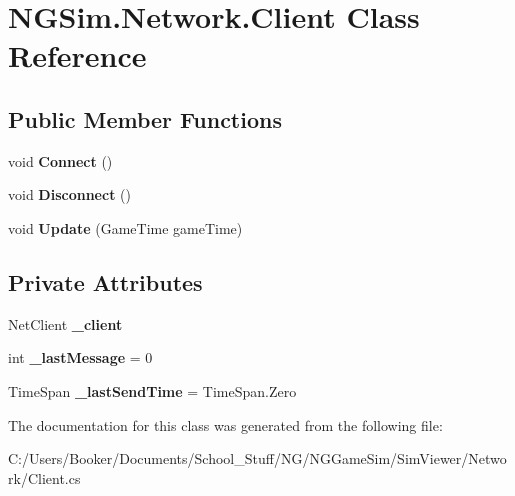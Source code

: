 \hypertarget{class_n_g_sim_1_1_network_1_1_client}{}\section{N\+G\+Sim.\+Network.\+Client Class Reference}
\label{class_n_g_sim_1_1_network_1_1_client}
\subsection*{Public Member Functions}
\begin{DoxyCompactItemize}
\item 
\mbox{\label{class_n_g_sim_1_1_network_1_1_client_a433d09b084cb3bccb2d19d34405b5c9a}} 
void {\bfseries Connect} ()
\item 
\mbox{\label{class_n_g_sim_1_1_network_1_1_client_aa3309ae7bdb5ad6c48073cc23f9ca41e}} 
void {\bfseries Disconnect} ()
\item 
\mbox{\label{class_n_g_sim_1_1_network_1_1_client_a5bd1f0db962cec9217a19025d5abdaea}} 
void {\bfseries Update} (Game\+Time game\+Time)
\end{DoxyCompactItemize}
\subsection*{Private Attributes}
\begin{DoxyCompactItemize}
\item 
\mbox{\label{class_n_g_sim_1_1_network_1_1_client_a4b246ac083f09bc74fd991f14786df17}} 
Net\+Client {\bfseries \+\_\+client}
\item 
\mbox{\label{class_n_g_sim_1_1_network_1_1_client_af96cbc162daf11626c2b30903bc66c0b}} 
int {\bfseries \+\_\+last\+Message} = 0
\item 
\mbox{\label{class_n_g_sim_1_1_network_1_1_client_a4b25b9d551af1feb0e70013be81b2ccc}} 
Time\+Span {\bfseries \+\_\+last\+Send\+Time} = Time\+Span.\+Zero
\end{DoxyCompactItemize}


The documentation for this class was generated from the following file\+:\begin{DoxyCompactItemize}
\item 
C\+:/\+Users/\+Booker/\+Documents/\+School\+\_\+\+Stuff/\+N\+G/\+N\+G\+Game\+Sim/\+Sim\+Viewer/\+Network/Client.\+cs\end{DoxyCompactItemize}
